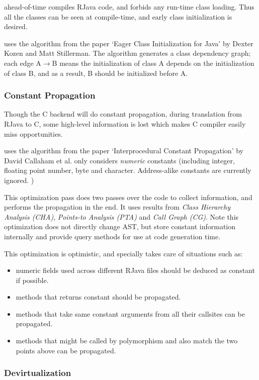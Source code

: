 \documentclass[12pt]{article}
\begin{document}
\rjc ahead-of-time compiles RJava code, and forbids any run-time class loading. 
Thus all the classes can be seen at compile-time, and early class initialization is desired. 

\rjc uses the algorithm from the paper `Eager Class Initialization for Java' by Dexter Kozen
and Matt Stillerman. The algorithm generates a class dependency graph; each edge A$\rightarrow$B
means the initialization of class A depends on the initialization of 
class B, and as a result, B should be initialized
before A. 

\subsubsection{Constant Propagation}

Though the C backend will do constant propagation, during translation from
RJava to C, some high-level information is lost which makes C compiler easily
miss opportunities. 

\rjc uses the algorithm from the paper `Interprocedural Constant Propagation'
by David Callaham et al. \rjc only considers \emph{numeric} constants (including integer,
floating point number, byte and character. Address-alike constants are currently
ignored. )

This optimization pass does two passes over the code to collect information, 
and performs the propagation in the end. 
It uses results from \emph{Class Hierarchy Analysis (CHA)}, 
\emph{Points-to Analysis (PTA)} and \emph{Call Graph (CG)}. Note
this optimization does not directly change AST, but store constant information
internally and provide query methods for use at code generation time. 

This optimization is optimistic, and specially takes care of situations such as:
\begin{itemize}
\item numeric  fields used across different RJava files 
should be deduced as constant if possible. 
\item methods that returns constant should be propagated.
\item methods that take same constant arguments from all their callsites can be
propagated. 
\item methods that might be called by polymorphism and also match the two points
above can be propagated.  
\end{itemize}

\subsubsection{Devirtualization}
\end{document}
